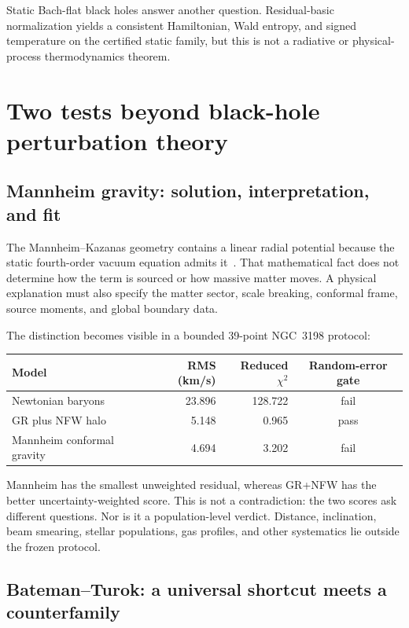 \documentclass[11pt]{article}
\begin{document}
Static Bach-flat black holes answer another question.  Residual-basic
normalization yields a consistent Hamiltonian, Wald entropy, and signed
temperature on the certified static family, but this is not a radiative or
physical-process thermodynamics theorem.

\section{Two tests beyond black-hole perturbation theory}

\subsection{Mannheim gravity: solution, interpretation, and fit}

The Mannheim--Kazanas geometry contains a linear radial potential because the
static fourth-order vacuum equation admits it~\cite{MK1989,MannheimOBrien2012}.
That mathematical fact does not determine how the term is sourced or how
massive matter moves.  A physical explanation must also specify the matter
sector, scale breaking, conformal frame, source moments, and global boundary
data.

The distinction becomes visible in a bounded 39-point NGC~3198 protocol:
\begin{center}
\begin{tabular}{lrrc}
\toprule
Model & RMS (km/s) & Reduced \(\chi^2\) & Random-error gate\\
\midrule
Newtonian baryons & 23.896 & 128.722 & fail\\
GR plus NFW halo & 5.148 & 0.965 & pass\\
Mannheim conformal gravity & 4.694 & 3.202 & fail\\
\bottomrule
\end{tabular}
\end{center}

Mannheim has the smallest unweighted residual, whereas GR+NFW has the better
uncertainty-weighted score.  This is not a contradiction: the two scores ask
different questions.  Nor is it a population-level verdict.  Distance,
inclination, beam smearing, stellar populations, gas profiles, and other
systematics lie outside the frozen protocol.

\subsection{Bateman--Turok: a universal shortcut meets a counterfamily}
\end{document}
